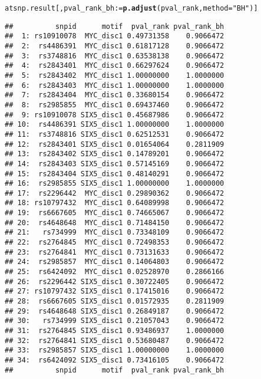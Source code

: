 \documentclass[a4paper,10pt]{article}\usepackage[]{graphicx}\usepackage[]{color}
\makeatletter
\newcommand{\hlstr}[1]{\textcolor[rgb]{0.192,0.494,0.8}{#1}}%
\newcommand{\hlstd}[1]{\textcolor[rgb]{0.345,0.345,0.345}{#1}}%
\newcommand{\hlkwb}[1]{\textcolor[rgb]{0.69,0.353,0.396}{#1}}%
\newcommand{\hlkwc}[1]{\textcolor[rgb]{0.333,0.667,0.333}{#1}}%
\newcommand{\hlkwd}[1]{\textcolor[rgb]{0.737,0.353,0.396}{\textbf{#1}}}%
\newenvironment{kframe}{%
 \def\at@end@of@kframe{}%
 \ifinner\ifhmode%
  \def\at@end@of@kframe{\end{minipage}}%
  \begin{minipage}{\columnwidth}%
 \fi\fi%
 \def\FrameCommand##1{\hskip\@totalleftmargin \hskip-\fboxsep
 \colorbox{shadecolor}{##1}\hskip-\fboxsep
     \hskip-\linewidth \hskip-\@totalleftmargin \hskip\columnwidth}%
 \MakeFramed {\advance\hsize-\width
   \@totalleftmargin\z@ \linewidth\hsize
   \@setminipage}}%
 {\par\unskip\endMakeFramed%
 \at@end@of@kframe}
\newenvironment{knitrout}{}{} %
\makeatother
\begin{document}
\begin{knitrout}
\color{fgcolor}\begin{kframe}
\begin{alltt}
\hlstd{atsnp.result[, pval_rank_bh} \hlkwb{:=} \hlkwd{p.adjust}\hlstd{(pval_rank,} \hlkwc{method} \hlstd{=} \hlstr{"BH"}\hlstd{)]}
\end{alltt}
\end{kframe}
\end{knitrout}


\begin{knitrout}
\color{fgcolor}\begin{kframe}
\begin{verbatim}
##          snpid      motif  pval_rank pval_rank_bh
##  1: rs10910078  MYC_disc1 0.49731358    0.9066472
##  2:  rs4486391  MYC_disc1 0.61817128    0.9066472
##  3:  rs3748816  MYC_disc1 0.63538138    0.9066472
##  4:  rs2843401  MYC_disc1 0.66297624    0.9066472
##  5:  rs2843402  MYC_disc1 1.00000000    1.0000000
##  6:  rs2843403  MYC_disc1 1.00000000    1.0000000
##  7:  rs2843404  MYC_disc1 0.33680154    0.9066472
##  8:  rs2985855  MYC_disc1 0.69437460    0.9066472
##  9: rs10910078 SIX5_disc1 0.45687986    0.9066472
## 10:  rs4486391 SIX5_disc1 1.00000000    1.0000000
## 11:  rs3748816 SIX5_disc1 0.62512531    0.9066472
## 12:  rs2843401 SIX5_disc1 0.01654064    0.2811909
## 13:  rs2843402 SIX5_disc1 0.14789201    0.9066472
## 14:  rs2843403 SIX5_disc1 0.57145169    0.9066472
## 15:  rs2843404 SIX5_disc1 0.48140291    0.9066472
## 16:  rs2985855 SIX5_disc1 1.00000000    1.0000000
## 17:  rs2296442  MYC_disc1 0.29890362    0.9066472
## 18: rs10797432  MYC_disc1 0.64089998    0.9066472
## 19:  rs6667605  MYC_disc1 0.74665067    0.9066472
## 20:  rs4648648  MYC_disc1 0.71484150    0.9066472
## 21:   rs734999  MYC_disc1 0.73348109    0.9066472
## 22:  rs2764845  MYC_disc1 0.72498353    0.9066472
## 23:  rs2764841  MYC_disc1 0.73131633    0.9066472
## 24:  rs2985857  MYC_disc1 0.14064803    0.9066472
## 25:  rs6424092  MYC_disc1 0.02528970    0.2866166
## 26:  rs2296442 SIX5_disc1 0.30722405    0.9066472
## 27: rs10797432 SIX5_disc1 0.17415016    0.9066472
## 28:  rs6667605 SIX5_disc1 0.01572935    0.2811909
## 29:  rs4648648 SIX5_disc1 0.26849187    0.9066472
## 30:   rs734999 SIX5_disc1 0.21057043    0.9066472
## 31:  rs2764845 SIX5_disc1 0.93486937    1.0000000
## 32:  rs2764841 SIX5_disc1 0.53680487    0.9066472
## 33:  rs2985857 SIX5_disc1 1.00000000    1.0000000
## 34:  rs6424092 SIX5_disc1 0.73416105    0.9066472
##          snpid      motif  pval_rank pval_rank_bh
\end{verbatim}
\end{kframe}
\end{knitrout}
\end{document}
